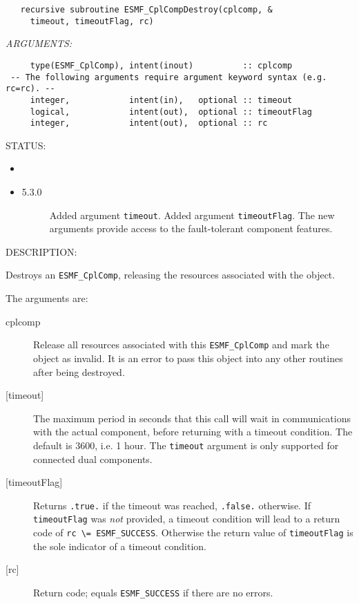  
\begin{verbatim}   recursive subroutine ESMF_CplCompDestroy(cplcomp, &
     timeout, timeoutFlag, rc)\end{verbatim}{\em ARGUMENTS:}
\begin{verbatim}     type(ESMF_CplComp), intent(inout)          :: cplcomp
 -- The following arguments require argument keyword syntax (e.g. rc=rc). --
     integer,            intent(in),   optional :: timeout
     logical,            intent(out),  optional :: timeoutFlag
     integer,            intent(out),  optional :: rc\end{verbatim}
{\sf STATUS:}
   \begin{itemize}
   \item{}
   \item{}
   \begin{description}
   \item[5.3.0] Added argument {\tt timeout}.
                Added argument {\tt timeoutFlag}.
                The new arguments provide access to the fault-tolerant component
                features.
   \end{description}
   \end{itemize}
  
{\sf DESCRIPTION:\\ }


   Destroys an {\tt ESMF\_CplComp}, releasing the resources associated
   with the object.
  
   The arguments are:
   \begin{description}
   \item[cplcomp]
     Release all resources associated with this {\tt ESMF\_CplComp}
     and mark the object as invalid.  It is an error to pass this
     object into any other routines after being destroyed.
   \item[{[timeout]}]
     The maximum period in seconds that this call will wait in communications
     with the actual component, before returning with a timeout condition.
     The default is 3600, i.e. 1 hour. The {\tt timeout} argument is only
     supported for connected dual components.
   \item[{[timeoutFlag]}]
     Returns {\tt .true.} if the timeout was reached, {\tt .false.} otherwise.
     If {\tt timeoutFlag} was {\em not} provided, a timeout condition will lead
     to a return code of {\tt rc \textbackslash = ESMF\_SUCCESS}. Otherwise the
     return value of {\tt timeoutFlag} is the sole indicator of a timeout
     condition.
   \item[{[rc]}]
     Return code; equals {\tt ESMF\_SUCCESS} if there are no errors.
   \end{description}
   
